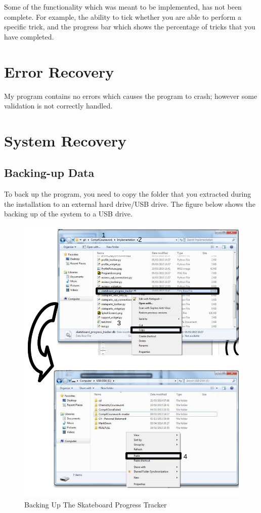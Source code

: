 Some of the functionality which was meant to be implemented, has not been complete. For example, the ability to tick whether you are able to perform a specific trick, and the progress bar which shows the percentage of tricks that you have completed. 





\section{Error Recovery} %

My program contains no errors which causes the program to crash; however some validation is not correctly handled.




\section{System Recovery}

\subsection{Backing-up Data} 

To back up the program, you need to copy the folder that you extracted during the installation to an external hard drive/USB drive. The figure below shows the backing up of the system to a USB drive.

\begin{figure}[H]
    \includegraphics[width=\textwidth]{./Manual/Images/BackUp.pdf}
    \caption{Backing Up The Skateboard Progress Tracker} \label{fig:BackUp}
\end{figure}

